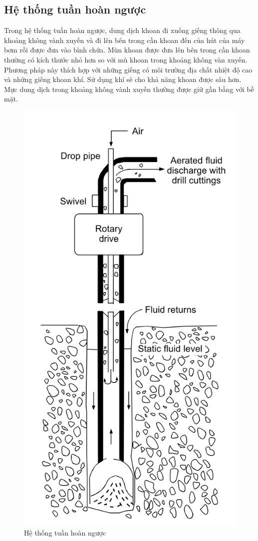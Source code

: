 \documentclass[13pt,a4paper]{article}
\begin{document}
\subsection{Hệ thống tuần hoàn ngược}
	Trong hệ thống tuần hoàn ngược, dung dịch khoan đi xuống giếng thông qua khoảng không vành xuyến và đi lên bên trong cần khoan đến của hút của máy bơm rồi được đưa vào bình chứa. Mùn khoan được đưa lên bên trong cần khoan thường có kích thước nhỏ hơn so với mù khoan trong khoảng không vàn xuyến. Phương pháp này thích hợp với những giếng có môi trường địa chất nhiệt độ cao và những giếng khoan khí. Sử dụng khí sẽ cho khả năng khoan được sâu hơn. Mực dung dịch trong khoảng không vành xuyến thường được giữ gần bằng với bề mặt.
	\begin{figure}[h]
		\centering
		\includegraphics[scale=0.2]{Figs/Fig4.png}
		\caption{Hệ thống tuần hoàn ngược}
	\end{figure}
\end{document}
